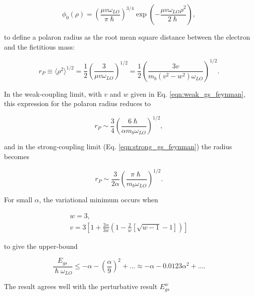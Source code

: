 \begin{equation}
    \label{eqn:gs_wavefunc_schultz}
    \phi_0(\rho) = \left( \frac{\mu v \omega_{LO}}{\pi\hslash} \right)^{3/4} \exp\left( -\frac{\mu v \omega_{LO} \rho^2}{2\hslash} \right),
\end{equation}

to define a polaron radius as the root mean square distance between the electron and the fictitious mass:

\begin{equation}
    \label{eqn:pol_size_schultz}
    r_P \equiv \langle \rho^2 \rangle^{1/2} = \frac{1}{2} \left(\frac{3}{\mu v \omega_{LO}}\right)^{1/2} = \frac{1}{2} \left( \frac{3 v}{m_b (v^2 - w^2) \omega_{LO}} \right)^{1/2}.
\end{equation}

In the weak-coupling limit, with $v$ and $w$ given in Eq. \ref{eqn:weak_gs_feynman}, this expression for the polaron radius reduces to

\begin{equation}
    \label{eqn:weak_size_schultz}
    r_P \sim \frac{3}{4} \left(\frac{6\hslash}{\alpha m_b \omega_{LO}}\right)^{1/2},
\end{equation}

and in the strong-coupling limit (Eq. \ref{eqn:strong_gs_feynman}) the radius becomes 

\begin{equation}
    \label{eqn:strong_size_schultz}
    r_P \sim \frac{3 }{2\alpha} \left(\frac{\pi \hslash}{m_b \omega_{LO}}\right)^{1/2}.
\end{equation}

For small $\alpha$, the variational minimum occurs when

\begin{equation}
\begin{gathered}
    w = 3, \\ 
    v = 3 \left[ 1 + \frac{2\alpha}{3w} \left(1 -\frac{2}{w} \left[ \sqrt{w-1}-1 \right] \right) \right]
\end{gathered}
\end{equation}

to give the upper-bound

\begin{equation}
    \frac{E_{gs}}{\hslash\omega_{LO}} \leq -\alpha - \left(\frac{\alpha}{9}\right)^2 + \dots \approx -\alpha - 0.0123 \alpha^2 + \dots.
\end{equation}

The result agrees well with the perturbative result $E^w_{gs}$

